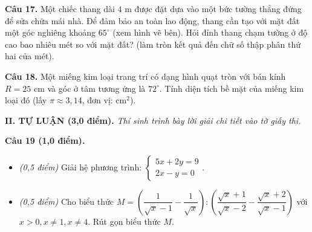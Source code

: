 \documentclass[11pt,a4paper]{article}
\begin{document}
\vspace{1.5mm}
\noindent
\begin{minipage}[c]{0.65\linewidth}
\textbf{Câu 17.} Một chiếc thang dài $4\text{ m}$ được đặt dựa vào một bức tường thẳng đứng để sửa chữa mái nhà. Để đảm bảo an toàn lao động, thang cần tạo với mặt đất một góc nghiêng khoảng $65^\circ$ (xem hình vẽ bên). Hỏi đỉnh thang chạm tường ở độ cao bao nhiêu mét so với mặt đất? (làm tròn kết quả đến chữ số thập phân thứ hai của mét).
\end{minipage}\hfill
\begin{minipage}[c]{0.32\linewidth}
\centering
{}
\end{minipage}

\vspace{1.5mm}
\textbf{Câu 18.} Một miếng kim loại trang trí có dạng hình quạt tròn với bán kính $R = 25\text{ cm}$ và góc ở tâm tương ứng là $72^\circ$. Tính diện tích bề mặt của miếng kim loại đó (lấy $\pi \approx 3{,}14$, đơn vị: $\text{cm}^2$).

\vspace{4mm}
\noindent
\textbf{\large II. TỰ LUẬN (3,0 điểm).} \textit{Thí sinh trình bày lời giải chi tiết vào tờ giấy thi.}

\vspace{2mm}
\textbf{Câu 19 (1,0 điểm).}
\begin{itemize}
  \item[a)] \textit{(0,5 điểm)} Giải hệ phương trình: $\begin{cases} 5x + 2y = 9 \\ 2x - y = 0 \end{cases}$.
  \item[b)] \textit{(0,5 điểm)} Cho biểu thức $M = \left( \dfrac{1}{\sqrt{x}-1} - \dfrac{1}{\sqrt{x}} \right) : \left( \dfrac{\sqrt{x}+1}{\sqrt{x}-2} - \dfrac{\sqrt{x}+2}{\sqrt{x}-1} \right)$ với $x > 0, x \ne 1, x \ne 4$. Rút gọn biểu thức $M$.
\end{itemize}
\end{document}
